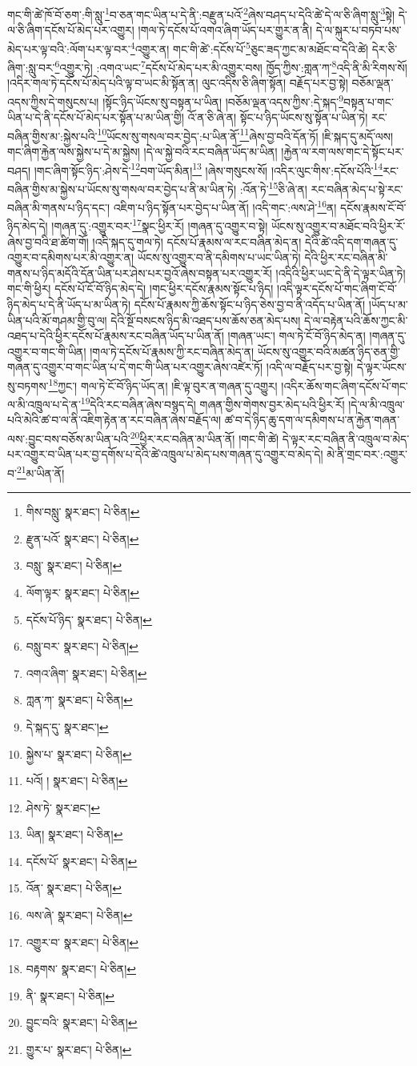 གང་གི་ཚེ་ཁོ་བོ་ཅག་:གི་སླུ་\footnote{གིས་བསླུ་  སྣར་ཐང་།  པེ་ཅིན། }བ་ཅན་གང་ཡིན་པ་དེ་ནི་:བརྫུན་པའོ་\footnote{རྫུན་པའོ་  སྣར་ཐང་།  པེ་ཅིན། }ཞེས་བཤད་པ་དེའི་ཚེ་དེ་ལ་ཅི་ཞིག་སླུ་\footnote{བསླུ་  སྣར་ཐང་།  པེ་ཅིན། }སྟེ། དེ་ལ་ཅི་ཞིག་དངོས་པོ་མེད་པར་འགྱུར། །གལ་ཏེ་དངོས་པོ་འགའ་ཞིག་ཡོད་པར་གྱུར་ན་ནི། དེ་ལ་སྐུར་པ་བཏབ་པས་མེད་པར་ལྟ་བའི་:ལོག་པར་ལྟ་བར་\footnote{ལོག་ལྟར་  སྣར་ཐང་།  པེ་ཅིན། }འགྱུར་ན། གང་གི་ཚེ་:དངོས་པོ་\footnote{དངོས་པོ་ཉིད་  སྣར་ཐང་།  པེ་ཅིན། }ཅུང་ཟད་ཀྱང་མ་མཐོང་བ་དེའི་ཚེ། དེར་ཅི་ཞིག་:སླུ་བར་\footnote{བསླུ་བར་  སྣར་ཐང་།  པེ་ཅིན། }འགྱུར་ཏེ། :འགའ་ཡང་\footnote{འགའ་ཞིག་  སྣར་ཐང་།  པེ་ཅིན། }དངོས་པོ་མེད་པར་མི་འགྱུར་བས། ཁྱོད་ཀྱིས་:གླན་ཀ་\footnote{ཀླན་ཀ་  སྣར་ཐང་།  པེ་ཅིན། }འདི་ནི་མི་རིགས་སོ། །འདིར་གལ་ཏེ་དངོས་པོ་མེད་པའི་ལྟ་བ་ཡང་མི་སྟོན་ན། ལུང་འདིས་ཅི་ཞིག་སྟོན། བརྗོད་པར་བྱ་སྟེ། བཅོམ་ལྡན་འདས་ཀྱིས་དེ་གསུངས་པ། །སྟོང་ཉིད་ཡོངས་སུ་བསྟན་པ་ཡིན། །བཅོམ་ལྡན་འདས་ཀྱིས་:དེ་སྐད་\footnote{དེ་སྐད་དུ་  སྣར་ཐང་། }བསྟན་པ་གང་ཡིན་པ་དེ་ནི་དངོས་པོ་མེད་པར་སྟོན་པ་མ་ཡིན་གྱི། འོ་ན་ཅི་ཞེ་ན། སྟོང་པ་ཉིད་ཡོངས་སུ་སྟོན་པ་ཡིན་ཏེ། རང་བཞིན་གྱིས་མ་:སྐྱེས་པའི་\footnote{སྐྱེས་པ་  སྣར་ཐང་།  པེ་ཅིན། }ཡོངས་སུ་གསལ་བར་བྱེད་:པ་ཡིན་ནོ་\footnote{པའོ། །  སྣར་ཐང་།  པེ་ཅིན། }ཞེས་བྱ་བའི་དོན་ཏོ། །ཇི་སྐད་དུ་མདོ་ལས། གང་ཞིག་རྐྱེན་ལས་སྐྱེས་པ་དེ་མ་སྐྱེས། །དེ་ལ་སྐྱེ་བའི་རང་བཞིན་ཡོད་མ་ཡིན། །རྐྱེན་ལ་རག་ལས་གང་དེ་སྟོང་པར་བཤད། །གང་ཞིག་སྟོང་ཉིད་:ཤེས་དེ་\footnote{ཤེས་ཏེ་  སྣར་ཐང་། }བག་ཡོད་མིན།\footnote{ཡིན།  སྣར་ཐང་།  པེ་ཅིན། } །ཞེས་གསུངས་སོ། །འདིར་ལུང་གིས་:དངོས་པོའི་\footnote{དངོས་པོ་  སྣར་ཐང་།  པེ་ཅིན། }རང་བཞིན་གྱིས་མ་སྐྱེས་པ་ཡོངས་སུ་གསལ་བར་བྱེད་པ་ནི་མ་ཡིན་ཏེ། :འོན་ཏེ་\footnote{འོན་  སྣར་ཐང་།  པེ་ཅིན། }ཅི་ཞེ་ན། རང་བཞིན་མེད་པ་སྟེ་རང་བཞིན་མི་གནས་པ་ཉིད་དང་། འཇིག་པ་ཉིད་སྟོན་པར་བྱེད་པ་ཡིན་ནོ། །འདི་གང་:ལས་ཤེ་\footnote{ལས་ཞེ་  སྣར་ཐང་།  པེ་ཅིན། }ན། དངོས་རྣམས་ངོ་བོ་ཉིད་མེད་དེ། །གཞན་དུ་:འགྱུར་བར་\footnote{འགྱུར་བ་  སྣར་ཐང་།  པེ་ཅིན། }སྣང་ཕྱིར་རོ། །གཞན་དུ་འགྱུར་བ་སྟེ། ཡོངས་སུ་འགྱུར་བ་མཐོང་བའི་ཕྱིར་རོ་ཞེས་བྱ་བའི་ཐ་ཚིག་གོ། །འདི་སྐད་དུ་གལ་ཏེ། དངོས་པོ་རྣམས་ལ་རང་བཞིན་མེད་ན། དེའི་ཚེ་འདི་དག་གཞན་དུ་འགྱུར་བ་དམིགས་པར་མི་འགྱུར་ན། ཡོངས་སུ་འགྱུར་བ་ནི་དམིགས་པ་ཡང་ཡིན་ཏེ། དེའི་ཕྱིར་རང་བཞིན་མི་གནས་པ་ཉིད་མདོའི་དོན་ཡིན་པར་ཤེས་པར་བྱའོ་ཞེས་བསྟན་པར་འགྱུར་རོ། །འདིའི་ཕྱིར་ཡང་དེ་ནི་དེ་ལྟར་ཡིན་ཏེ། གང་གི་ཕྱིར། དངོས་པོ་ངོ་བོ་ཉིད་མེད་དེ། །གང་ཕྱིར་དངོས་རྣམས་སྟོང་པ་ཉིད། །འདི་ལྟར་དངོས་པོ་གང་ཞིག་ངོ་བོ་ཉིད་མེད་པ་དེ་ནི་ཡོད་པ་མ་ཡིན་ཏེ། དངོས་པོ་རྣམས་ཀྱི་ཆོས་སྟོང་པ་ཉིད་ཅེས་བྱ་བ་ནི་འདོད་པ་ཡིན་ནོ། །ཡོད་པ་མ་ཡིན་པའི་མོ་གཤམ་གྱི་བུ་ལ། དེའི་སྔོ་བསངས་ཉིད་མི་འཐད་པས་ཆོས་ཅན་མེད་པས། དེ་ལ་བརྟེན་པའི་ཆོས་ཀྱང་མི་འཐད་པ་དེའི་ཕྱིར་དངོས་པོ་རྣམས་རང་བཞིན་ཡོད་པ་ཡིན་ནོ། །གཞན་ཡང་། གལ་ཏེ་ངོ་བོ་ཉིད་མེད་ན། །གཞན་དུ་འགྱུར་བ་གང་གི་ཡིན། །གལ་ཏེ་དངོས་པོ་རྣམས་ཀྱི་རང་བཞིན་མེད་ན། ཡོངས་སུ་འགྱུར་བའི་མཚན་ཉིད་ཅན་གྱི་གཞན་དུ་འགྱུར་བ་གང་ཡིན་པ་དེ་གང་གི་ཡིན་པར་འགྱུར་ཞེས་འཛེར་ཏོ། །འདི་ལ་བརྗོད་པར་བྱ་སྟེ། དེ་ལྟར་ཡོངས་སུ་བཏགས་\footnote{བརྟགས་  སྣར་ཐང་།  པེ་ཅིན། }ཀྱང་། གལ་ཏེ་ངོ་བོ་ཉིད་ཡོད་ན། །ཇི་ལྟ་བུར་ན་གཞན་དུ་འགྱུར། །འདིར་ཆོས་གང་ཞིག་དངོས་པོ་གང་ལ་མི་འཁྲུལ་པ་དེ་ན་\footnote{ནི་  སྣར་ཐང་།  པེ་ཅིན། }དེའི་རང་བཞིན་ཞེས་བསྙད་དེ། གཞན་གྱིས་གེགས་བྱར་མེད་པའི་ཕྱིར་རོ། །དེ་ལ་མི་འཁྲུལ་པའི་མེའི་ཚ་བ་ལ་ནི་འཇིག་རྟེན་ན་རང་བཞིན་ཞེས་བརྗོད་ལ། ཚ་བ་དེ་ཉིད་ཆུ་དག་ལ་དམིགས་པ་ན་རྐྱེན་གཞན་ལས་:བྱུང་བས་བཅོས་མ་ཡིན་པའི་\footnote{བྱུང་བའི་  སྣར་ཐང་།  པེ་ཅིན། }ཕྱིར་རང་བཞིན་མ་ཡིན་ནོ། །གང་གི་ཚེ། དེ་ལྟར་རང་བཞིན་ནི་འཁྲུལ་བ་མེད་པར་འགྱུར་བ་ཡིན་པར་བྱ་དགོས་པ་དེའི་ཚེ་འཁྲུལ་པ་མེད་པས་གཞན་དུ་འགྱུར་བ་མེད་དེ། མེ་ནི་གྲང་བར་:འགྱུར་བ་\footnote{གྱུར་པ་  སྣར་ཐང་།  པེ་ཅིན། }མ་ཡིན་ནོ། 